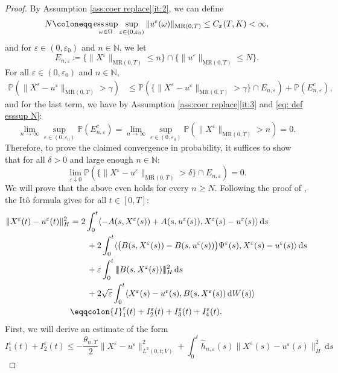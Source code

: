 \documentclass{amsart}
\newcommand{\dd}{\,\mathrm{d}}
\renewcommand{\MR}{\mathrm{MR}}
\newcommand{\<}{\langle}
\newcommand{\?}{\rangle}
\newcommand{\nn}{|\!|\!|}
\DeclareMathOperator*{\esssup}{\textup{ess\,sup}}
\theoremstyle{plain}
\theoremstyle{remark}
\theoremstyle{plain}
\numberwithin{equation}{section}
\def\N{{\mathbb N}}
\renewcommand{\P}{\mathbb{P}}
\newcommand{\om}{\omega}
\newcommand{\Om}{\Omega}
\newcommand{\eps}{\varepsilon}
\begin{document}
\begin{proof}
By Assumption \ref{ass:coer replace}\ref{it:2}, we can define 
\begin{align}\label{eq: def esssup N}
N\coloneqq \esssup_{\om\in\Om}\sup_{\eps\in(0,\eps_0)}\|u^\eps(\om)\|_{\MR(0,T)}\leq C_{x}(T,K)<\infty,
\end{align}
and for $\eps\in(0,\eps_0)$ and $n\in\N$, we let 
\[
E_{n,\eps}\coloneqq \{\|X^\eps\|_{\MR(0,T)}\leq n\}\cap \{\|u^{\eps}\|_{\MR(0,T)}\leq N\}.
\]
For all $\eps\in(0,\eps_0)$ and $n\in\N$,  
\begin{align*}
\P(\|X^\eps- u^{\eps}\|_{\MR(0,T)}>\gamma)
&\leq \P(\{\|X^\eps- u^{\eps}\|_{\MR(0,T)}>\gamma\}\cap E_{n,\eps})+\P(E_{n,\eps}^c), 
\end{align*}
and for the last term, we have by Assumption \ref{ass:coer replace}\ref{it:3}  and \eqref{eq: def esssup N}: 
\[
\lim_{n\to\infty}\sup_{\eps\in(0,\eps_0)}\P(E_{n,\eps}^c)= \lim_{n\to\infty}\sup_{\eps\in(0,\eps_0)}\P(\|X^\eps\|_{\MR(0,T)}>n)=0. 
\]
Therefore, to prove the claimed convergence in probability, it suffices to show that for all $\delta>0$ and   large enough $n\in\N$:
\begin{equation}\label{eq: X^eps weak conv to show 2}
  \lim_{\eps\downarrow 0}\P(\{\|X^\eps- u^{\eps}\|_{\MR(0,T)}>\delta\}\cap E_{n,\eps})=0.
\end{equation}
We will prove that the above even holds for every $n\geq N$. Following the proof of \cite[Prop.\ 4.12]{TV24}, 
  the It\^o formula \cite[(A.4)]{TV24} gives for all $t\in[0,T]$:
  \begin{align}
    \|X^\eps(t)-u^{\eps}(t)\|_H^2
    &=2\int_0^t\<-A(s,X^\eps(s))+A(s,u^{\eps}(s)),X^\eps(s)-u^{\eps}(s)\?\dd s\notag\\
    &\qquad+2\int_0^t\<\big(B(s,X^\eps(s))-B(s,u^{\eps}(s))\big)\Psi^\eps(s),X^\eps(s)-u^{\eps}(s)\?\dd s\notag\\
    &\qquad+\eps\int_0^t \nn B(s,X^\eps(s))\nn_H^2\dd s\notag\\
    &\qquad+2\sqrt{\eps}\int_0^t \<X^\eps(s)-u^{\eps}(s),B(s,X^\eps(s))\dd W(s)\?\notag\\
    &\eqqcolon {I}_1^\eps(t)+{I}_2^\eps(t)+{I}_3^\eps(t)+{I}_4^\eps(t). \label{eq: I_i^eps}
    \end{align}
   First, we will derive an estimate of the form
    \begin{equation}\label{eq: to show I^1 I^2}
    {I}_1^\eps(t)+{I}_2^\eps(t)\leq -\frac{\theta_{n,T}}{2}\|X^\eps-u^{\eps}\|_{L^2(0,t;V)}^2+\int_0^t \hat{h}_{n,\eps}(s)\|X^\eps(s)-u^{\eps}(s)\|_H^2 \dd s

\end{equation}
\end{proof}
\end{document}
